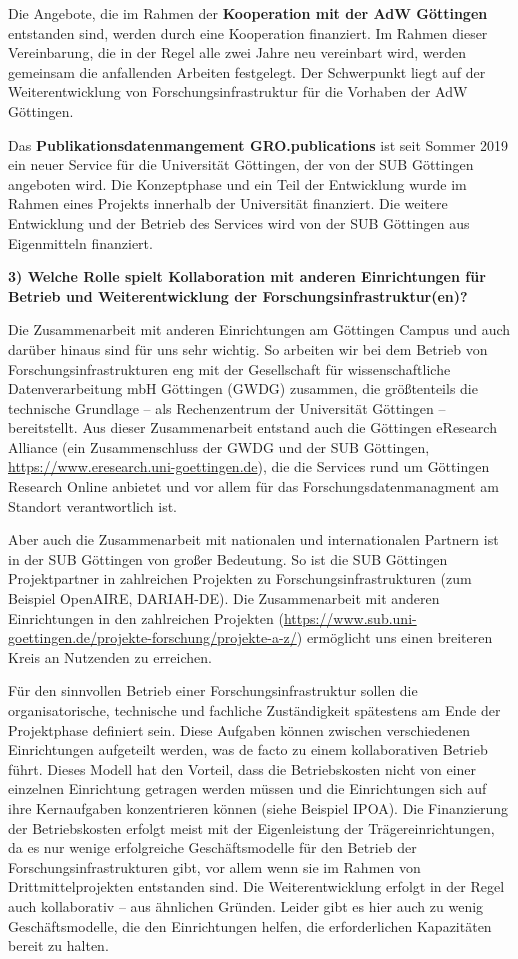 \documentclass[a4paper,
fontsize=11pt,
oneside,
numbers=noperiodatend,
parskip=half-,
bibliography=totoc,
final
]{scrartcl}
\begin{document}
Die Angebote, die im Rahmen der \textbf{Kooperation mit der AdW
Göttingen} entstanden sind, werden durch eine Kooperation finanziert. Im
Rahmen dieser Vereinbarung, die in der Regel alle zwei Jahre neu
vereinbart wird, werden gemeinsam die anfallenden Arbeiten festgelegt.
Der Schwerpunkt liegt auf der Weiterentwicklung von
Forschungsinfrastruktur für die Vorhaben der AdW Göttingen.

Das \textbf{Publikationsdatenmangement GRO.publications} ist seit Sommer
2019 ein neuer Service für die Universität Göttingen, der von der SUB
Göttingen angeboten wird. Die Konzeptphase und ein Teil der Entwicklung
wurde im Rahmen eines Projekts innerhalb der Universität finanziert. Die
weitere Entwicklung und der Betrieb des Services wird von der SUB
Göttingen aus Eigenmitteln finanziert.

\textbf{3) Welche Rolle spielt Kollaboration mit anderen Einrichtungen
für Betrieb und Weiterentwicklung der Forschungsinfrastruktur(en)?}

Die Zusammenarbeit mit anderen Einrichtungen am Göttingen Campus und
auch darüber hinaus sind für uns sehr wichtig. So arbeiten wir bei dem
Betrieb von Forschungsinfrastrukturen eng mit der Gesellschaft für
wissenschaftliche Datenverarbeitung mbH Göttingen (GWDG) zusammen, die
größtenteils die technische Grundlage -- als Rechenzentrum der
Universität Göttingen -- bereitstellt. Aus dieser Zusammenarbeit
entstand auch die Göttingen eResearch Alliance (ein Zusammenschluss der
GWDG und der SUB Göttingen,
\url{https://www.eresearch.uni-goettingen.de}), die die Services rund um
Göttingen Research Online anbietet und vor allem für das
Forschungsdatenmanagment am Standort verantwortlich ist.

Aber auch die Zusammenarbeit mit nationalen und internationalen Partnern
ist in der SUB Göttingen von großer Bedeutung. So ist die SUB Göttingen
Projektpartner in zahlreichen Projekten zu Forschungsinfrastrukturen
(zum Beispiel OpenAIRE, DARIAH-DE). Die Zusammenarbeit mit anderen
Einrichtungen in den zahlreichen Projekten
(\url{https://www.sub.uni-goettingen.de/projekte-forschung/projekte-a-z/})
ermöglicht uns einen breiteren Kreis an Nutzenden zu erreichen.

Für den sinnvollen Betrieb einer Forschungsinfrastruktur sollen die
organisatorische, technische und fachliche Zuständigkeit spätestens am
Ende der Projektphase definiert sein. Diese Aufgaben können zwischen
verschiedenen Einrichtungen aufgeteilt werden, was de facto zu einem
kollaborativen Betrieb führt. Dieses Modell hat den Vorteil, dass die
Betriebskosten nicht von einer einzelnen Einrichtung getragen werden
müssen und die Einrichtungen sich auf ihre Kernaufgaben konzentrieren
können (siehe Beispiel IPOA). Die Finanzierung der Betriebskosten
erfolgt meist mit der Eigenleistung der Trägereinrichtungen, da es nur
wenige erfolgreiche Geschäftsmodelle für den Betrieb der
Forschungsinfrastrukturen gibt, vor allem wenn sie im Rahmen von
Drittmittelprojekten entstanden sind. Die Weiterentwicklung erfolgt in
der Regel auch kollaborativ -- aus ähnlichen Gründen. Leider gibt es
hier auch zu wenig Geschäftsmodelle, die den Einrichtungen helfen, die
erforderlichen Kapazitäten bereit zu halten.
\end{document}
